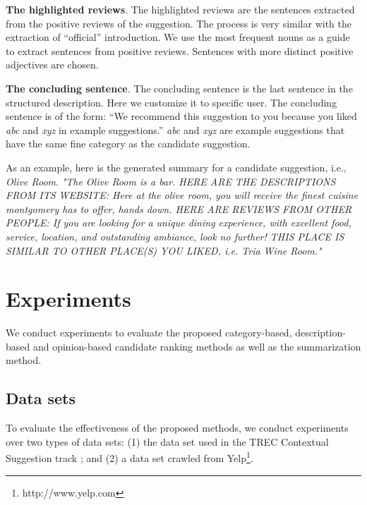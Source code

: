 \textbf{The highlighted reviews}.
  The highlighted reviews are the sentences extracted from 
  the positive reviews of the suggestion. The process is very
  similar with the extraction of ``official'' introduction. 
  We use the most frequent nouns as a guide to extract 
  sentences from positive reviews. Sentences with more 
  distinct positive adjectives are chosen.

\textbf{The concluding sentence}.
  The concluding sentence is the last sentence in the structured
  description. Here we customize it to specific user. The
  concluding sentence is of the form: ``We recommend this 
  suggestion to you because you liked \textit{abc} and 
  \textit{xyz} in example suggestions.'' 
  \textit{abc} and \textit{xyz} are example suggestions that 
  have the same fine category as the candidate suggestion.

As an example, here is the generated summary for a candidate
suggestion, i.e., {\em Olive Room}. 
\textit{"The Olive Room is a bar. HERE ARE THE DESCRIPTIONS FROM ITS WEBSITE: Here at the olive room, you will receive the finest cuisine montgomery has to offer, hands down. HERE ARE REVIEWS FROM OTHER PEOPLE: If you are looking for a unique dining experience, with excellent food, service, location, and outstanding ambiance, look no further! THIS PLACE IS SIMILAR TO OTHER PLACE(S) YOU LIKED, i.e. Tria Wine Room."}


\section{Experiments}  \label{sec:exps_n_results}

We conduct experiments to evaluate the proposed category-based, 
description-based and opinion-based candidate ranking methods 
as well as the summarization method.

\subsection{Data sets}
\label{sec:data}
To evaluate the effectiveness of the proposed methods, we
conduct experiments over two types of data sets: (1)
the data set used in the TREC Contextual Suggestion
track \cite{adriel:overview}; and (2) a data set
crawled from Yelp\footnote{http://www.yelp.com}.

